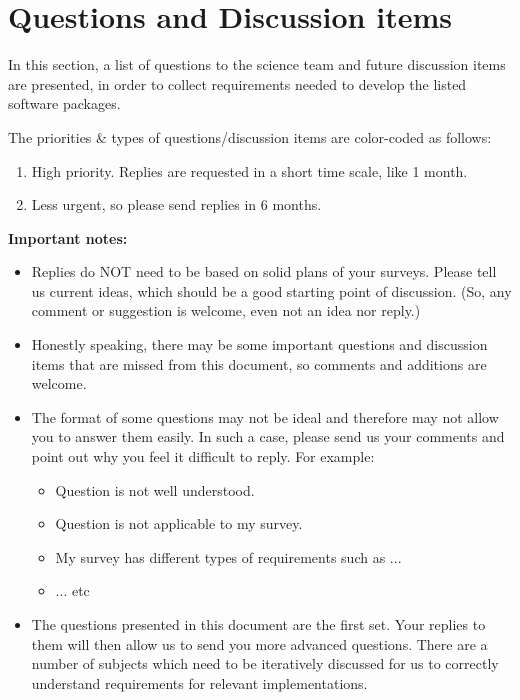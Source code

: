 \documentclass[a4paper,notitlepage]{article}
\begin{document}
\section{Questions and Discussion items}

In this section, a list of questions to the science team and future
discussion items are presented, in order to collect requirements needed
to develop the listed software packages.

The priorities \& types of questions/discussion items are color-coded as
follows:
\begin{enumerate}
  \item[\cols{x}] High priority. Replies are requested in a short time
           scale, like 1 month.
  \item[\colm{x}] Less urgent, so please send replies in 6 months.
\end{enumerate}

{\bf Important notes:}
\begin{itemize}
 \item Replies do NOT need to be based on solid plans of your
   surveys. Please tell us current ideas, which should be a good
   starting point of discussion.
       (So, any comment or suggestion is welcome, even not an idea nor reply.) 
 \item Honestly speaking, there may be some important questions and
       discussion items that are missed from this document, so comments
       and additions are welcome.
 \item The format of some questions may not be ideal and therefore may
       not allow you to answer them easily. In such a case, please send
       us your comments and point out why you feel it difficult to
       reply. For example:
       \begin{itemize}
    \item Question is not well understood.
    \item Question is not applicable to my survey.
    \item My survey has different types of requirements such as ... 
    \item ... etc
       \end{itemize}
 \item The questions presented in this document are the first
   set. Your replies to them will then allow us to send you more
   advanced questions. There are a number of subjects which need to be
   iteratively discussed for us to correctly understand requirements
   for relevant implementations.
\end{itemize}
\end{document}
